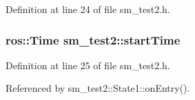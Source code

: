 Definition at line 24 of file sm\+\_\+test2.\+h.

\subsubsection[{\texorpdfstring{start\+Time}{startTime}}]{\setlength{\rightskip}{0pt plus 5cm}ros\+::\+Time sm\+\_\+test2\+::start\+Time}\hypertarget{namespacesm__test2_a0b4e1ce52146b421cf6062a0900035aa}{}\label{namespacesm__test2_a0b4e1ce52146b421cf6062a0900035aa}


Definition at line 25 of file sm\+\_\+test2.\+h.



Referenced by sm\+\_\+test2\+::\+State1\+::on\+Entry().

